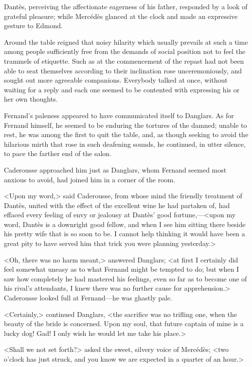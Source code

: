  Dantès, perceiving the affectionate eagerness of his father, responded by a look of grateful pleasure; while Mercédès glanced at the clock and made an expressive gesture to Edmond. 

 Around the table reigned that noisy hilarity which usually prevails at such a time among people sufficiently free from the demands of social position not to feel the trammels of etiquette. Such as at the commencement of the repast had not been able to seat themselves according to their inclination rose unceremoniously, and sought out more agreeable companions. Everybody talked at once, without waiting for a reply and each one seemed to be contented with expressing his or her own thoughts. 

 Fernand's paleness appeared to have communicated itself to Danglars. As for Fernand himself, he seemed to be enduring the tortures of the damned; unable to rest, he was among the first to quit the table, and, as though seeking to avoid the hilarious mirth that rose in such deafening sounds, he continued, in utter silence, to pace the farther end of the salon. 

 Caderousse approached him just as Danglars, whom Fernand seemed most anxious to avoid, had joined him in a corner of the room. 

 <Upon my word,> said Caderousse, from whose mind the friendly treatment of Dantès, united with the effect of the excellent wine he had partaken of, had effaced every feeling of envy or jealousy at Dantès' good fortune,—<upon my word, Dantès is a downright good fellow, and when I see him sitting there beside his pretty wife that is so soon to be. I cannot help thinking it would have been a great pity to have served him that trick you were planning yesterday.> 

 <Oh, there was no harm meant,> answered Danglars; <at first I certainly did feel somewhat uneasy as to what Fernand might be tempted to do; but when I saw how completely he had mastered his feelings, even so far as to become one of his rival's attendants, I knew there was no further cause for apprehension.> Caderousse looked full at Fernand—he was ghastly pale. 

 <Certainly,> continued Danglars, <the sacrifice was no trifling one, when the beauty of the bride is concerned. Upon my soul, that future captain of mine is a lucky dog! Gad! I only wish he would let me take his place.> 

 <Shall we not set forth?> asked the sweet, silvery voice of Mercédès; <two o'clock has just struck, and you know we are expected in a quarter of an hour.>  
 
